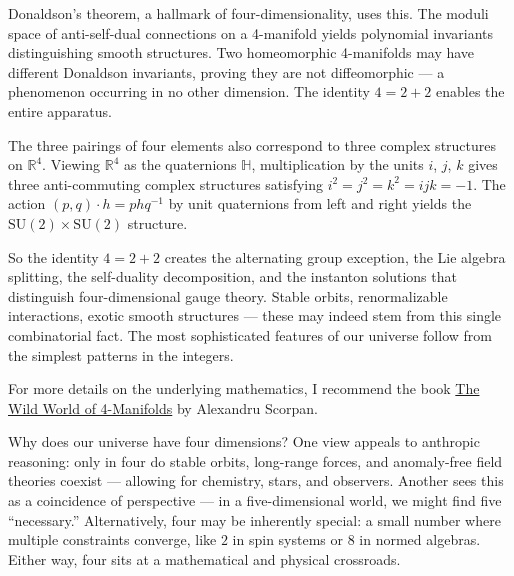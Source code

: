 Donaldson's theorem, a hallmark of four-dimensionality, uses this. The moduli space of anti-self-dual connections on a 4-manifold yields polynomial invariants distinguishing smooth structures. Two homeomorphic 4-manifolds may have different Donaldson invariants, proving they are not diffeomorphic — a phenomenon occurring in no other dimension. The identity $4 = 2 + 2$ enables the entire apparatus.

The three pairings of four elements also correspond to three complex structures on $\mathbb{R}^4$. Viewing $\mathbb{R}^4$ as the quaternions $\mathbb{H}$, multiplication by the units $i$, $j$, $k$ gives three anti-commuting complex structures satisfying $i^2 = j^2 = k^2 = ijk = -1$. The action $(p,q) \cdot h = phq^{-1}$ by unit quaternions from left and right yields the $\mathrm{SU}(2) \times \mathrm{SU}(2)$ structure.

So the identity $4 = 2 + 2$ creates the alternating group exception, the Lie algebra splitting, the self-duality decomposition, and the instanton solutions that distinguish four-dimensional gauge theory. Stable orbits, renormalizable interactions, exotic smooth structures — these may indeed stem from this single combinatorial fact. The most sophisticated features of our universe follow from the simplest patterns in the integers.

For more details on the underlying mathematics, I recommend the book \href{https://bookstore.ams.org/FOURMAN}{The Wild World of 4-Manifolds} by Alexandru Scorpan.

\begin{commentary}
Why does our universe have four dimensions? One view appeals to anthropic reasoning: only in four do stable orbits, long-range forces, and anomaly-free field theories coexist — allowing for chemistry, stars, and observers. Another sees this as a coincidence of perspective — in a five-dimensional world, we might find five “necessary.” Alternatively, four may be inherently special: a small number where multiple constraints converge, like $2$ in spin systems or $8$ in normed algebras. Either way, four sits at a mathematical and physical crossroads.
\end{commentary}

